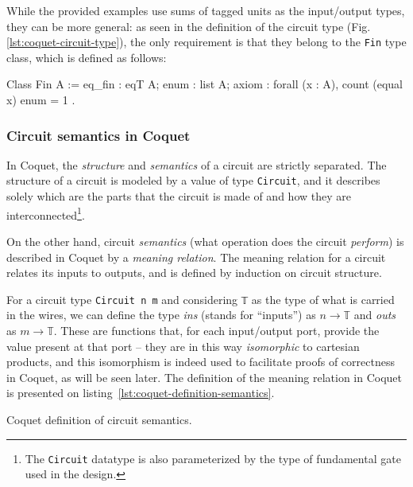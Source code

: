             While the provided examples use sums of tagged units as the input/output types, they can
            be more general: as seen in the definition of the circuit type (Fig.
            \ref{lst:coquet-circuit-type}), the only requirement is that they belong to the
            \texttt{Fin} type class, which is defined as follows:

            \begin{coqcode}
        Class Fin A := {
            eq_fin : eqT A;
            enum   : list A;
            axiom  : forall (x : A), count (equal x) enum = 1
        }.
            \end{coqcode}


        \subsubsection{Circuit semantics in Coquet}
        \label{subsubsec:coquet-semantics}
            In Coquet, the \emph{structure} and \emph{semantics} of a circuit are strictly
            separated. The structure of a circuit is modeled by a value of type \texttt{Circuit},
            and it describes solely which are the parts that the circuit is made of and how they are
            interconnected\footnote{The \texttt{Circuit} datatype is also parameterized by the type
                of fundamental gate used in the design.}.

            On the other hand, circuit \emph{semantics} (what operation does the circuit
            \emph{perform}) is described in Coquet by a \emph{meaning relation}. The meaning
            relation for a circuit relates its inputs to outputs, and is defined by induction on
            circuit structure.

            For a circuit type \texttt{Circuit n m} and considering \texttt{𝕋} as the type of
            what is carried in the wires, we can define the type \emph{ins} (stands for
            ``inputs'') as $n \rightarrow 𝕋$ and \emph{outs} as $m \rightarrow 𝕋$. These are
            functions that, for each input/output port, provide the value present at that port
            -- they are in this way \emph{isomorphic} to cartesian products, and this isomorphism
            is indeed used to facilitate proofs of correctness in Coquet, as will be seen later.
            The definition of the meaning relation in Coquet is presented on
            listing~\ref{lst:coquet-definition-semantics}.

            \begin{listing}[h!]
                \caption{Coquet definition of circuit semantics.
                    \label{lst:coquet-definition-semantics}}
            \end{listing}


